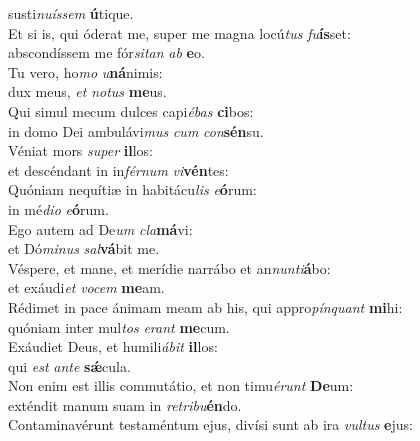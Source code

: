 \evenverse susti\textit{nu}\textit{ís}\textit{sem} \textbf{ú}tique.\\
\oddverse Et si is, qui óderat me, super me magna locú\textit{tus} \textit{fu}\textbf{ís}set:~\*\\
\oddverse abscondíssem me fór\textit{si}\textit{tan} \textit{ab} \textbf{e}o.\\
\evenverse Tu vero, ho\textit{mo} \textit{u}\textbf{ná}nimis:~\*\\
\evenverse dux meus, \textit{et} \textit{no}\textit{tus} \textbf{me}us.\\
\oddverse Qui simul mecum dulces capi\textit{é}\textit{bas} \textbf{ci}bos:~\*\\
\oddverse in domo Dei ambulávi\textit{mus} \textit{cum} \textit{con}\textbf{sén}su.\\
\evenverse Véniat mors \textit{su}\textit{per} \textbf{il}los:~\*\\
\evenverse et descéndant in in\textit{fér}\textit{num} \textit{vi}\textbf{vén}tes:\\
\oddverse Quóniam nequítiæ in habitácu\textit{lis} \textit{e}\textbf{ó}rum:~\*\\
\oddverse in mé\textit{di}\textit{o} \textit{e}\textbf{ó}rum.\\
\evenverse Ego autem ad De\textit{um} \textit{cla}\textbf{má}vi:~\*\\
\evenverse et Dó\textit{mi}\textit{nus} \textit{sal}\textbf{vá}bit me.\\
\oddverse Véspere, et mane, et merídie narrábo et an\textit{nun}\textit{ti}\textbf{á}bo:~\*\\
\oddverse et exáudi\textit{et} \textit{vo}\textit{cem} \textbf{me}am.\\
\evenverse Rédimet in pace ánimam meam ab his, qui appro\textit{pín}\textit{quant} \textbf{mi}hi:~\*\\
\evenverse quóniam inter mul\textit{tos} \textit{e}\textit{rant} \textbf{me}cum.\\
\oddverse Exáudiet Deus, et humili\textit{á}\textit{bit} \textbf{il}los:~\*\\
\oddverse qui \textit{est} \textit{an}\textit{te} \textbf{sǽ}cula.\\
\evenverse Non enim est illis commutátio, et non timu\textit{é}\textit{runt} \textbf{De}um:~\*\\
\evenverse exténdit manum suam in \textit{re}\textit{tri}\textit{bu}\textbf{én}do.\\
\oddverse Contaminavérunt testaméntum ejus, divísi sunt ab ira \textit{vul}\textit{tus} \textbf{e}jus:~\*\\
